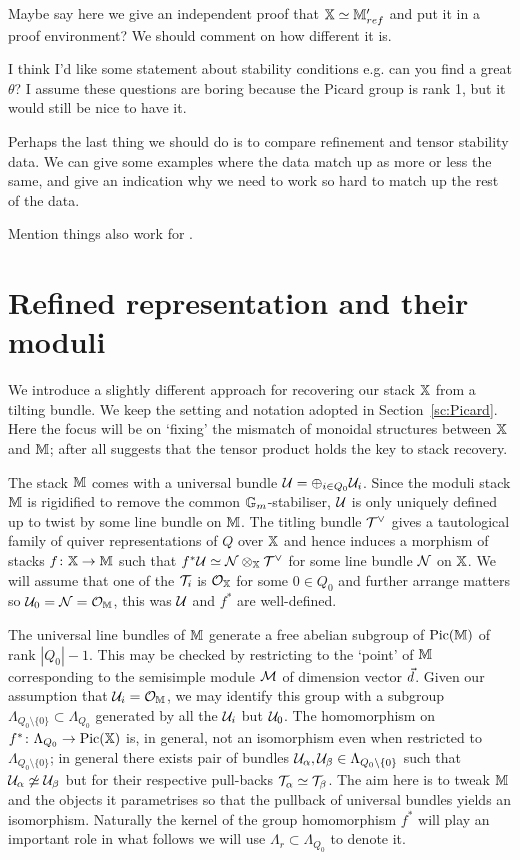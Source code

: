 \documentclass[12pt]{amsart}
\begin{document}
{\red Maybe say here we give an independent proof that $\mathbb{X} \simeq \mathbb{M}'_{ref}$ and put it in a proof environment? We should comment on how different it is.}

{\red I think I'd like some statement about stability conditions e.g. can you find a great $\theta$? I assume these questions are boring because the Picard group is rank 1, but it would still be nice to have it.}

{\red Perhaps the last thing we should do is to compare refinement and tensor stability data. We can give some examples where the data match up as more or less the same, and give an indication why we need to work so hard to match up the rest of the data.}

{\red Mention things also work for \cite{C17}.}

\section{Refined representation and their moduli}

We introduce a slightly different approach for recovering our stack $\mathbb{X}$ from a tilting bundle.
We keep the setting and notation adopted in Section~\ref{sc:Picard}.
Here the focus will be on `fixing' the mismatch of monoidal structures between $\mathbb{X}$ and $\mathbb{M}$; after all \cite{Lurie} suggests that the tensor product holds the key to stack recovery.

The stack $\mathbb{M}$ comes with a universal bundle $\mathcal{U}  = \oplus_{i \in Q_0} \mathcal{U}_i$.
Since the moduli stack $\mathbb{M}$ is rigidified to remove the common $\mathbb{G}_m$-stabiliser, $\mathcal{U}$ is only uniquely defined up to twist by some line bundle on $\mathbb{M}$.
The titling bundle $\mathcal{T}^{\vee}$ gives a tautological family of quiver representations of $Q$ over $\mathbb{X}$ and hence induces a morphism of stacks $f \colon \mathbb{X} \rightarrow \mathbb{M}$ such that $f^* \mathcal{U} \simeq \mathcal{N} \otimes_{\mathbb{X}} \mathcal{T}^{\vee}$ for some line bundle $\mathcal{N}$ on $\mathbb{X}$.
We will assume that one of the $\mathcal{T}_i$ is $\mathcal{O}_{\mathbb{X}}$ for some $0 \in Q_0$ and further arrange matters so $\mathcal{U}_0 = \mathcal{N} = \mathcal{O}_{\mathbb{M}}$, this was $\mathcal{U}$ and $f^*$ are well-defined.

The universal line bundles of $\mathbb{M}$ generate a free abelian subgroup of $\operatorname{Pic}(\mathbb{M})$ of rank $|Q_0|-1$.
This may be checked by restricting to the `point' of $\mathbb{M}$ corresponding to the semisimple module $\mathcal{M}$ of dimension vector ${\vec{d}}$.
Given our assumption that $\mathcal{U}_i = \mathcal{O}_{\mathbb{M}}$, we may identify this group with a subgroup $\Lambda_{Q_0 \setminus \{0\}} \subset \Lambda_{Q_0}$ generated by all the $\mathcal{U}_i$ but $\mathcal{U}_0$.
The homomorphism on $f^* \colon \Lambda_{Q_0} \rightarrow \operatorname{Pic}(\mathbb{X})$ is, in general, not an isomorphism even when restricted to $\Lambda_{Q_0 \setminus \{0\}}$; in general there exists pair of bundles $\mathcal{U}_\alpha, \mathcal{U}_\beta \in \Lambda_{Q_0 \setminus \{0\}}$ such that $\mathcal{U}_\alpha \not\simeq \mathcal{U}_\beta$ but for their respective pull-backs $\mathcal{T}_\alpha \simeq \mathcal{T}_\beta$.
The aim here is to tweak $\mathbb{M}$ and the objects it parametrises so that the pullback of universal bundles yields an isomorphism.
Naturally the kernel of the group homomorphism $f^*$ will play an important role in what follows we will use $\Lambda_r \subset \Lambda_{Q_0}$ to denote it.
\end{document}
